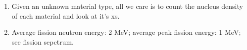 \documentclass{school-22.211-notes}
\begin{document}
\begin{enumerate}
\item Given an unknown material type, all we care is to count the nucleus density of each material and look at it's xs. 
\item Average fission neutron energy: 2 MeV; average peak fission energy: 1 MeV; see fission sepctrum. 
\end{enumerate}
\end{document}
